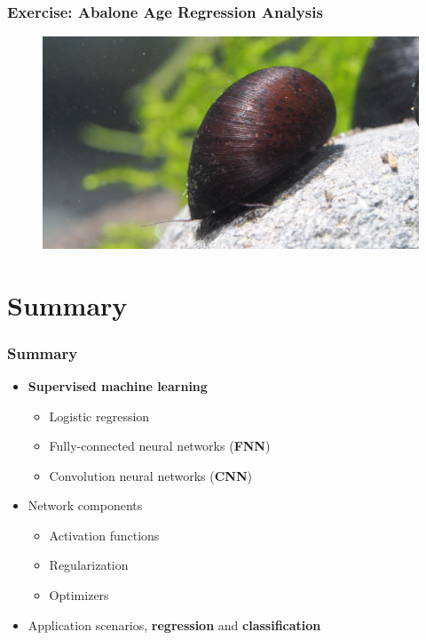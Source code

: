 \documentclass[aspectratio=169]{beamer}
\newcommand\imageright[1]{ %
    \caption*{\scalebox{.5}{\textcolor{lightgray}{\textcopyright~#1}}} %
}
\begin{document}
\begin{frame}
    \frametitle{Exercise: Abalone Age Regression Analysis}
    \begin{figure}
        \centering
        \includegraphics[width=0.7\linewidth]{abalone.jpg}
        \imageright{Garnelaxia}
    \end{figure}
\end{frame}

\section{Summary}
\label{sec:summary}

\begin{frame}
\frametitle{Summary}

\begin{itemize}
    \item \textbf{Supervised machine learning}
    \begin{itemize}
        \item Logistic regression
        \item Fully-connected neural networks (\textbf{FNN})
        \item Convolution neural networks (\textbf{CNN})
    \end{itemize}
    \item Network components
    \begin{itemize}
        \item Activation functions
        \item Regularization
        \item Optimizers
    \end{itemize}
    \item Application scenarios, \textbf{regression} and \textbf{classification}
\end{itemize}
\end{frame}
\end{document}
